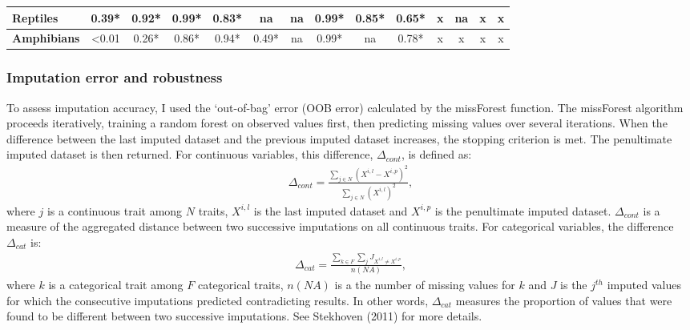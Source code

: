 \begin{table}[h!]
\begin{center}
\begin{tabular}{|l|c|c|c|c|c|c|c|c|c|c|c|c|c|}
\textbf{Reptiles}                                     & 0.39*             & 0.92*        & 0.99*          & 0.83*         & na            & na            & 0.99*        & 0.85*        & 0.65*        & x                      & na                     & x                      & x                      \\ \hline
\textbf{Amphibians}                                   & \textless{}0.01   & 0.26*        & 0.86*          & 0.94*         & 0.49*         & na            & 0.99*        & na           & 0.78*        & x                      & x                      & x                      & x                      \\ \hline
\end{tabular}
\end{center}
\end{table}



\subsubsection{Imputation error and robustness}
To assess imputation accuracy, I used the `out-of-bag' error (OOB error) calculated by the missForest function. The missForest algorithm proceeds iteratively, training a random forest on observed values first, then predicting missing values over several iterations. When the difference between the last imputed dataset and the previous imputed dataset increases, the stopping criterion is met. The penultimate imputed dataset is then returned. For continuous variables, this difference, $\Delta_{cont}$,  is defined as:
\begin{align}
\Delta_{cont}=\frac{\sum_{j \in N}\left(X^{i,l}-X^{i,p}\right)^2}{\sum_{j \in N}\left(X^{i,l}\right)^2}, 
\end{align}
where $j$ is a continuous trait among $N$ traits, $X^{i,l}$ is the last imputed dataset and $X^{i,p}$ is the penultimate imputed dataset.  $\Delta_{cont}$ is a measure of the aggregated distance between two successive imputations on all continuous traits.  For categorical variables, the difference $\Delta_{cat}$ is:
\begin{align}
\Delta_{cat}=\frac{\sum_{k \in F}\sum_{j} J_{X^{i,l}\neq X^{i,p}}}{n(NA)}, 
\label{eqPFC}
\end{align}
where $k$ is a categorical trait among $F$ categorical traits, $n(NA)$ is a the number of missing values for $k$ and $J$ is the $j^{th}$ imputed values for which the consecutive imputations predicted contradicting results. In other words, $\Delta_{cat}$ measures the proportion of values that were found to be different between two successive imputations.
See Stekhoven (2011) for more details.


